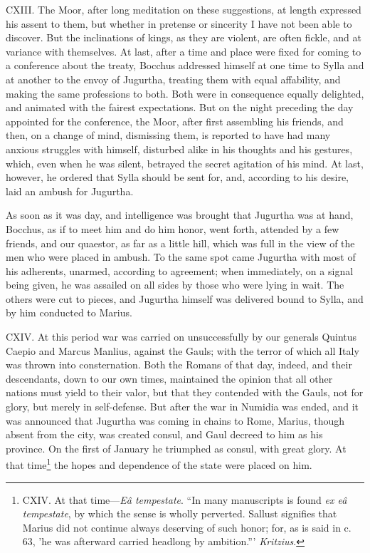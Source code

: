 CXIII. The Moor, after long meditation on these suggestions, at length
expressed his assent to them, but whether in pretense or sincerity I
have not been able to discover. But the inclinations of kings, as they
are violent, are often fickle, and at variance with themselves. At
last, after a time and place were fixed for coming to a conference
about the treaty, Bocchus addressed himself at one time to Sylla and
at another to the envoy of Jugurtha, treating them with equal
affability, and making the same professions to both. Both were in
consequence equally delighted, and animated with the fairest
expectations. But on the night preceding the day appointed for the
conference, the Moor, after first assembling his friends, and then,
on a change of mind, dismissing them, is reported to have had many
anxious struggles with himself, disturbed alike in his thoughts and
his gestures, which, even when he was silent, betrayed the secret
agitation of his mind. At last, however, he ordered that Sylla should
be sent for, and, according to his desire, laid an ambush for
Jugurtha.

As soon as it was day, and intelligence was brought that Jugurtha was
at hand, Bocchus, as if to meet him and do him honor, went forth,
attended by a few friends, and our quaestor, as far as a little hill,
which was full in the view of the men who were placed in ambush. To
the same spot came Jugurtha with most of his adherents, unarmed,
according to agreement; when immediately, on a signal being given, he
was assailed on all sides by those who were lying in wait. The others
were cut to pieces, and Jugurtha himself was delivered bound to Sylla,
and by him conducted to Marius.

CXIV. At this period war was carried on unsuccessfully by our generals
Quintus Caepio and Marcus Manlius, against the Gauls; with the terror
of which all Italy was thrown into consternation. Both the Romans of
that day, indeed, and their descendants, down to our own times,
maintained the opinion that all other nations must yield to their
valor, but that they contended with the Gauls, not for glory, but
merely in self-defense. But after the war in Numidia was ended, and
it was announced that Jugurtha was coming in chains to Rome, Marius,
though absent from the city, was created consul, and Gaul decreed to
him as his province. On the first of January he triumphed as consul,
with great glory. At that time\footnote{CXIV. At that time—\emph{Eâ tempestate}. ``In many manuscripts
is found \emph{ex eâ tempestate}, by which the sense is wholly perverted.
Sallust signifies that Marius did not continue always deserving of
such honor; for, as is said in c. 63, 'he was afterward carried
headlong by ambition.''' \emph{Kritzius}.} the hopes and dependence of the
state were placed on him.

